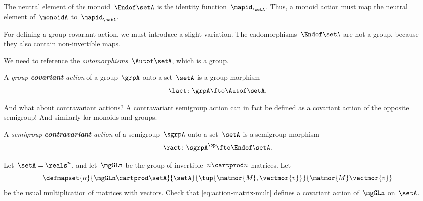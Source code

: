 The neutral element of the monoid~$\Endof\setA$ is the identity function~$\mapid_{\setA}$.
Thus, a monoid action must map the neutral element of~$\monoidA$ to~$\mapid_{\setA}$.
%

For defining a group covariant action, we must introduce a slight variation.
The endomorphisms~$\Endof\setA$ are not a group, because they also contain non-invertible maps.

We need to reference the \emph{automorphisms}~$\Autof\setA$, which is a group.
\begin{ctdefinition}
	\label{def:group-cov-action}
	A \emph{group \textbf{covariant} action} of a group~$\grpA$ onto a set~$\setA$ is a group morphism
	\begin{equation}
		\label{eq:act-group}
		\lact \colon \grpA \fto \Autof\setA.
	\end{equation}
\end{ctdefinition}

And what about contravariant actions?
A contravariant semigroup action can in fact be defined as a covariant action of the opposite semigroup!
And similarly for monoids and groups.

\begin{ctdefinition}
	\label{def:semigroup-cont-action}
	A \emph{semigroup \textbf{contravariant} action} of a semigroup~$\sgrpA$ onto a set~$\setA$ is a semigroup morphism
	\begin{equation}
		\ract \colon \sgrpA^{\op} \fto \Endof\setA.
	\end{equation}
\end{ctdefinition}

\vfill%


\begin{gradedexercise}
	\label{ex:MatrixMultAction}
	Let~$\setA = \reals^n$, and let~$\mgGLn$ be the group of invertible~$n \cartprod n$ matrices.
	Let
	\begin{equation}
		\label{eq:action-matrix-mult}
		\defmapset{
			\alpha
		}{
			\mgGLn \cartprod \setA
		}{
			\setA
		}{
			\tup{\matmor{M}, \vectmor{v}}
		}{
			\matmor{M}\vectmor{v}
		}
	\end{equation}
	be the usual multiplication of matrices with vectors.
	Check that \cref{eq:action-matrix-mult} defines a covariant action of~$\mgGLn$ on~$\setA$.
\end{gradedexercise}

